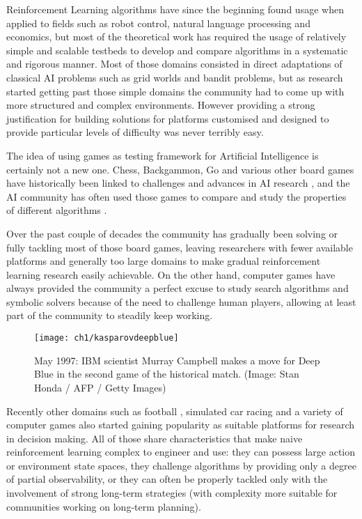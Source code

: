 Reinforcement Learning algorithms have since the beginning found usage when
applied to fields such as robot control, natural language processing and
economics, but most of the theoretical work has required the usage of relatively
simple and scalable testbeds to develop and compare algorithms in a systematic
and rigorous manner. Most of those domains consisted in direct adaptations of
classical AI problems such as grid worlds and bandit problems, but as research
started getting past those simple domains the community had to come up with more
structured and complex environments. However providing a strong justification
for building solutions for platforms customised and designed to provide
particular levels of difficulty was never terribly easy.

The idea of using games as testing framework for Artificial Intelligence is
certainly not a new one. Chess, Backgammon, Go and various other board games
have historically been linked to challenges and advances in AI research
\citep{minsky1961steps}, and the AI community has often used those games to
compare and study the properties of different algorithms
\citep{silver2009reinforcement, tesauro1995temporal, campbell2002deep}.

Over the past couple of decades the community has gradually been solving or
fully tackling most of those board games, leaving researchers with fewer
available platforms and generally too large domains to make gradual
reinforcement learning research easily achievable. On the other hand, computer
games have always provided the community a perfect excuse to study search
algorithms and symbolic solvers because of the need to challenge human players,
allowing at least part of the community to steadily keep working.

\begin{figure}[h]
    \centering
    \texttt{[image: ch1/kasparovdeepblue]}
    \caption{May 1997: IBM scientist Murray Campbell makes a move for Deep Blue
      in the second game of the historical match. (Image: Stan Honda / AFP /
      Getty Images)}
    \label{fig:kasparovdeepblue}
\end{figure}

Recently other domains such as football \citep{kitano1997robocup}, simulated car
racing \citep{wymann2013torcs}and a variety of computer games also started
gaining popularity as suitable platforms for research in decision making. All of
those share characteristics that make naive reinforcement learning complex to
engineer and use: they can possess large action or environment state spaces,
they challenge algorithms by providing only a degree of partial observability,
or they can often be properly tackled only with the involvement of strong
long-term strategies (with complexity more suitable for communities working on
long-term planning).

